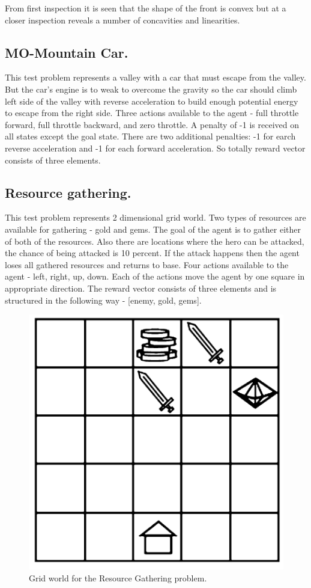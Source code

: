 {{From first inspection it is seen that the shape of the front is convex but at a closer inspection reveals a number of concavities and linearities. \\


\subsection{MO-Mountain Car.}
This test problem represents a valley with a car that must escape from the valley. But the car's engine is to weak to overcome the gravity so the car should climb left side of the valley with reverse acceleration to build enough potential energy to escape from the right side. Three actions available to the agent - full
throttle forward, full throttle backward, and zero throttle. A penalty of -1 is received on all states except the goal state. There are two additional penalties: -1 for earch reverse acceleration and -1 for each forward acceleration. So totally reward vector consists of three elements. \\

\subsection{Resource gathering.}
This test problem represents 2 dimensional grid world. Two types of resources are available for gathering - gold and gems. The goal of the agent is to gather either of both of the resources. Also there are locations where the hero can be attacked, the chance of being attacked is 10 percent. If the attack happens then the agent loses all gathered resources and returns to base. Four actions available to the agent - left, right, up, down. Each of the actions move the agent by one square in appropriate direction. The reward vector consists of three elements and is structured in the following way - [enemy, gold, gems]. \\
\begin{figure}[ht]
\vskip 0.2in
\centering
\includegraphics[scale=0.6]{rg.png}
\caption{Grid world for the Resource Gathering problem.}
\label{ParetoDominance}
\end{figure}

}}
